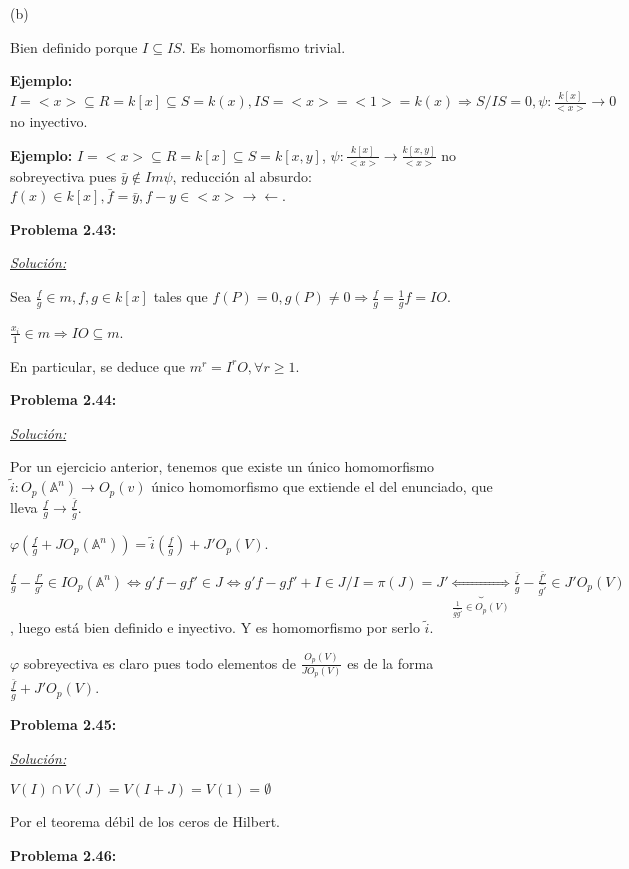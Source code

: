 (b)

Bien definido porque $I\subseteq IS$. Es homomorfismo trivial. 

\textbf{Ejemplo: } $I=<x> \subseteq R=k[x]\subseteq S=k(x), IS=<x>=<1>=k(x)\Rightarrow S/IS = 0, \psi : \frac{k[x]}{<x>}\rightarrow 0$ no inyectivo. 

\textbf{Ejemplo: } $I=<x>\subseteq R = k[x] \subseteq S=k[x,y]$, $\psi: \frac{k[x]}{<x>} \rightarrow \frac{k[x,y]}{<x>}$ no sobreyectiva pues $\bar{y} \notin Im \psi$, reducción al absurdo: $f(x)\in k[x], \bar{f}=\bar{y}, f-y \in <x> \rightarrow \leftarrow$. 


\textbf{Problema 2.43:} 

\underline{\textit{Solución:}}

Sea $\frac{f}{g} \in m, f,g \in k[x]$ tales que $f(P)=0, g(P)\neq 0 \Rightarrow \frac{f}{g}=\frac{1}{g}f=IO$. 

$\frac{x_i}{1}\in m \Rightarrow IO \subseteq m$.

En particular, se deduce que $m^r=I^rO, \forall r \ge 1$.

\textbf{Problema 2.44:} 

\underline{\textit{Solución:}}

Por un ejercicio anterior, tenemos que existe un único homomorfismo $\tilde{i}:O_p(\mathbb{A}^n)\rightarrow O_p(v)$ único homomorfismo que extiende el del enunciado, que lleva $\frac{f}{g} \rightarrow \frac{\bar{f}}{\bar{g}}$.

$\varphi(\frac{f}{g}+JO_p(\mathbb{A}^n))=\tilde{i}(\frac{f}{g})+J'O_p(V)$.

$\frac{f}{g}-\frac{f'}{g'}\in IO_p(\mathbb{A}^n)\Leftrightarrow g'f-gf' \in J \Leftrightarrow g'f-gf'+I \in J/I=\pi(J)=J' \underbrace{\Leftrightarrow}_{\frac{1}{\bar{gg'}}\in O_p(V)} \frac{\bar{f}}{\bar{g}}-\frac{\bar{f'}}{\bar{g'}}\in J'O_p(V)$, luego está bien definido e inyectivo. Y es homomorfismo por serlo $\tilde{i}$.

$\varphi $ sobreyectiva es claro pues todo elementos de $\frac{O_p(V)}{JO_p(V)}$ es de la forma $\frac{\bar{f}}{\bar{g}}+J'O_p(V)$. 


\textbf{Problema 2.45:} 

\underline{\textit{Solución:}}

\framebox{$\Rightarrow$} $V(I)\cap V(J)=V(I+J)=V(1)=\emptyset$

\framebox{$\Leftrightarrow$} Por el teorema débil de los ceros de Hilbert. 

\textbf{Problema 2.46: }

